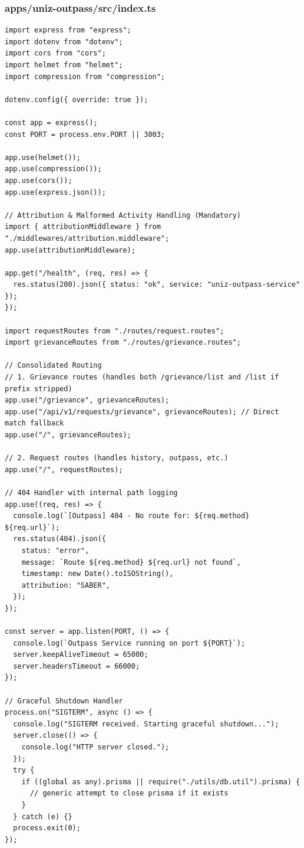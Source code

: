 \documentclass[11pt,a4paper,oneside]{article}
\begin{document}
\subsubsection*{apps/uniz-outpass/src/index.ts}
\begin{lstlisting}
import express from "express";
import dotenv from "dotenv";
import cors from "cors";
import helmet from "helmet";
import compression from "compression";

dotenv.config({ override: true });

const app = express();
const PORT = process.env.PORT || 3003;

app.use(helmet());
app.use(compression());
app.use(cors());
app.use(express.json());

// Attribution & Malformed Activity Handling (Mandatory)
import { attributionMiddleware } from "./middlewares/attribution.middleware";
app.use(attributionMiddleware);

app.get("/health", (req, res) => {
  res.status(200).json({ status: "ok", service: "uniz-outpass-service" });
});

import requestRoutes from "./routes/request.routes";
import grievanceRoutes from "./routes/grievance.routes";

// Consolidated Routing
// 1. Grievance routes (handles both /grievance/list and /list if prefix stripped)
app.use("/grievance", grievanceRoutes);
app.use("/api/v1/requests/grievance", grievanceRoutes); // Direct match fallback
app.use("/", grievanceRoutes);

// 2. Request routes (handles history, outpass, etc.)
app.use("/", requestRoutes);

// 404 Handler with internal path logging
app.use((req, res) => {
  console.log(`[Outpass] 404 - No route for: ${req.method} ${req.url}`);
  res.status(404).json({
    status: "error",
    message: `Route ${req.method} ${req.url} not found`,
    timestamp: new Date().toISOString(),
    attribution: "SABER",
  });
});

const server = app.listen(PORT, () => {
  console.log(`Outpass Service running on port ${PORT}`);
  server.keepAliveTimeout = 65000;
  server.headersTimeout = 66000;
});

// Graceful Shutdown Handler
process.on("SIGTERM", async () => {
  console.log("SIGTERM received. Starting graceful shutdown...");
  server.close(() => {
    console.log("HTTP server closed.");
  });
  try {
    if ((global as any).prisma || require("./utils/db.util").prisma) {
      // generic attempt to close prisma if it exists
    }
  } catch (e) {}
  process.exit(0);
});

\end{lstlisting}
\end{document}
